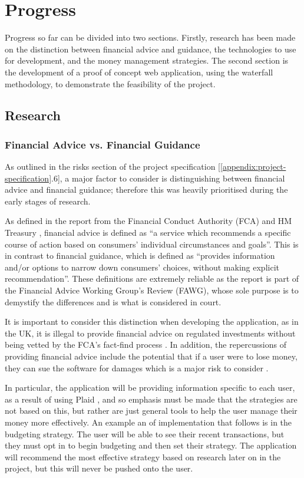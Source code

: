 \section{Progress} \label{sec:progress}
Progress so far can be divided into two sections. Firstly, research has been made on the distinction between financial advice and guidance, the technologies to use for development, and the money management strategies. The second section is the development of a proof of concept web application, using the waterfall methodology, to demonstrate the feasibility of the project.

\subsection{Research}
\subsubsection{Financial Advice vs. Financial Guidance}
As outlined in the risks section of the project specification [\ref{appendix:project-specification}.6], a major factor to consider is distinguishing between financial advice and financial guidance; therefore this was heavily prioritised during the early stages of research.

As defined in the report from the Financial Conduct Authority (FCA) and HM Treasury \cite{FCAReport}, financial advice is defined as ``a service which recommends a specific course of action based on consumers' individual circumstances and goals''. This is in contrast to financial guidance, which is defined as ``provides information and/or options to narrow down consumers' choices, without making explicit recommendation''. These definitions are extremely reliable as the report is part of the Financial Advice Working Group's Review (FAWG), whose sole purpose is to demystify the differences and is what is considered in court.

It is important to consider this distinction when developing the application, as in the UK, it is illegal to provide financial advice on regulated investments without being vetted by the FCA's fact-find process \cite{FinancialAdviceLegalities}. In addition, the repercussions of providing financial advice include the potential that if a user were to lose money, they can sue the software for damages which is a major risk to consider \cite{SueBroker}. 

In particular, the application will be providing information specific to each user, as a result of using Plaid \cite{Plaid}, and so emphasis must be made that the strategies are not based on this, but rather are just general tools to help the user manage their money more effectively. An example an of implementation that follows is in the budgeting strategy. The user will be able to see their recent transactions, but they must opt in to begin budgeting and then set their strategy. The application will recommend the most effective strategy based on research later on in the project, but this will never be pushed onto the user.


